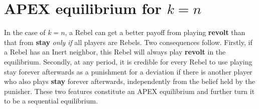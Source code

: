 \documentclass[12pt,letter]{article}
\theoremstyle{definition}
\theoremstyle{remark}
\theoremstyle{claim}
\begin{document}
\section{APEX equilibrium for $k=n$}
\label{sec:equilibrium_1}


In the case of $k=n$, a Rebel can get a better payoff from playing \textbf{revolt} than that from \textbf{stay} \textit{only if} all players are Rebels. Two consequences follow. Firstly, if a Rebel has an Inert neighbor, this Rebel will always play \textbf{revolt} in the equilibrium. Secondly, at any period, it is credible for every Rebel to use playing stay forever afterwards as a punishment for a deviation if there is another player who also plays \textbf{stay} forever afterwards, independently from the belief held by the punisher. These two features constitute an APEX equilibrium and further turn it to be a sequential equilibrium. 
\end{document}
